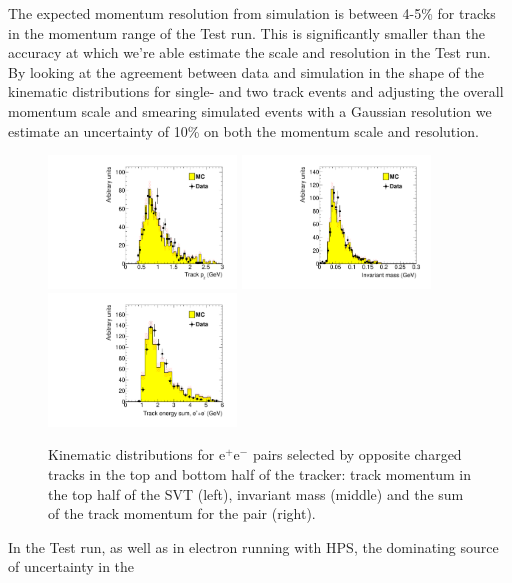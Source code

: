 \documentclass[final,3p,times,twocolumn]{elsarticle}
\begin{document}
The expected momentum resolution from simulation is between 4-5\% 
for tracks in the momentum range of the Test run. This is significantly smaller than the accuracy at 
which we're able estimate the scale and resolution in the Test run. By looking at the agreement 
between data and simulation in the shape of the kinematic distributions for single- and two track 
events and adjusting the overall momentum scale and smearing simulated events with a 
Gaussian resolution we estimate an uncertainty of 10\% on both the momentum scale and 
resolution.
 \begin{center}
{\small
\begin{figure}[t]
   \includegraphics[width=5cm]{figures/h_trk_top_px_h_trk_top_px_trigsel4hit_pair1351_twotrkfilt-v6-paper}
   \includegraphics[width=5cm]{figures/h_invM_h_invM_trigsel4hit_pair1351_twotrkfilt-v6-paper}
   \includegraphics[width=5cm]{figures/h_sumE_h_sumE_trigsel4hit_pair1351_twotrkfilt-v6-paper}
\caption{Kinematic distributions for e$^+$e$^-$ pairs selected by opposite charged tracks in the top and bottom half of the tracker: track momentum in the top half of the SVT (left), invariant mass (middle) and the sum of the track momentum for the pair (right).}
\label{fig:pair_kin}
\end{figure}
}
\end{center}
In the Test run, as well as in electron running with HPS, the dominating source of uncertainty in the 
\end{document}
